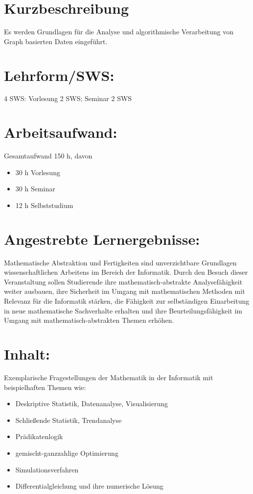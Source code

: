 \section*{Kurzbeschreibung}\label{kurzbeschreibung-1}

Es werden Grundlagen für die Analyse und algorithmische Verarbeitung von
Graph basierten Daten eingeführt.

\section*{Lehrform/SWS:}\label{lehrformsws-2}

4 SWS: Vorlesung 2 SWS; Seminar 2 SWS

\section*{Arbeitsaufwand:}\label{arbeitsaufwand-2}

Gesamtaufwand 150 h, davon

\begin{itemize}
\item
  30 h Vorlesung
\item
  30 h Seminar
\item
  12 h Selbststudium
\end{itemize}

\section*{Angestrebte
Lernergebnisse:}\label{angestrebte-lernergebnisse-2}

Mathematische Abstraktion und Fertigkeiten sind unverzichtbare
Grundlagen wissenschaftlichen Arbeitens im Bereich der Informatik. Durch
den Besuch dieser Veranstaltung sollen Studierende ihre
mathematisch-abstrakte Analysefähigkeit weiter ausbauen, ihre Sicherheit
im Umgang mit mathematischen Methoden mit Relevanz für die Informatik
stärken, die Fähigkeit zur selbständigen Einarbeitung in neue
mathematische Sachverhalte erhalten und ihre Beurteilungsfähigkeit im
Umgang mit mathematisch-abstrakten Themen erhöhen.

\section*{Inhalt:}\label{inhalt-2}

Exemplarische Fragestellungen der Mathematik in der Informatik mit
beispielhaften Themen wie:

\begin{itemize}
\item
  Deskriptive Statistik, Datenanalyse, Visualisierung
\item
  Schließende Statistik, Trendanalyse
\item
  Prädikatenlogik
\item
  gemischt-ganzzahlige Optimierung
\item
  Simulationsverfahren
\item
  Differentialgleichung und ihre numerische Lösung
\end{itemize}

